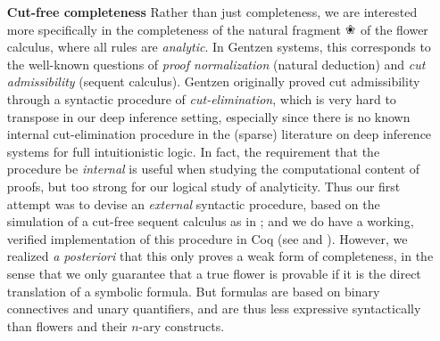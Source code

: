 \begin{itemize}
  \item[\textbf{Cut-free completeness}]
    Rather than just completeness, we are interested more specifically in the
    completeness of the natural fragment $\Nature$ of the flower calculus, where
    all rules are \emph{analytic}. In Gentzen systems, this corresponds to the
    well-known questions of \emph{proof normalization} (natural deduction) and
    \emph{cut admissibility} (sequent calculus). Gentzen originally proved cut
    admissibility through a syntactic procedure of \emph{cut-elimination}, which
    is very hard to transpose in our deep inference setting, especially since
    there is no known internal cut-elimination procedure in the (sparse)
    literature on deep inference systems for full intuitionistic logic. In fact,
    the requirement that the procedure be \emph{internal} is useful when
    studying the computational content of proofs, but too strong for our logical
    study of analyticity. Thus our first attempt was to devise an
    \emph{external} syntactic procedure, based on the simulation of a cut-free
    sequent calculus as in ; and we do have a working,
    verified implementation of this procedure in Coq (see
    \cite{flowers-metatheory} and ). However, we
    realized \textit{a posteriori} that this only proves a weak form of
    completeness, in the sense that we only guarantee that a true flower is
    provable if it is the direct translation of a symbolic formula. But formulas
    are based on binary connectives and unary quantifiers, and are thus less
    expressive syntactically than flowers and their $n$-ary constructs.


\end{itemize}
